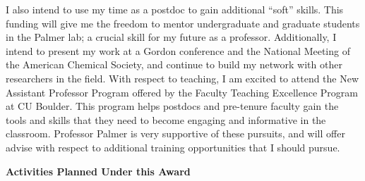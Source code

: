 \documentclass[11pt]{article}
\begin{document}
I also intend to use my time as a postdoc to gain additional ``soft'' skills. This funding will give me the freedom to mentor undergraduate and graduate students in the Palmer lab; a crucial skill for my future as a professor. Additionally, I intend to present my work at a Gordon conference and the National Meeting of the American Chemical Society, and continue to build my network with other researchers in the field. With respect to teaching, I am excited to attend the New Assistant Professor Program offered by the Faculty Teaching Excellence Program at CU Boulder. This program helps postdocs and pre-tenure faculty gain the tools and skills that they need to become engaging and informative in the classroom. Professor Palmer is very supportive of these pursuits, and will offer advise with respect to additional training opportunities that I should pursue.

\textbf{Activities Planned Under this Award}\\
\end{document}
